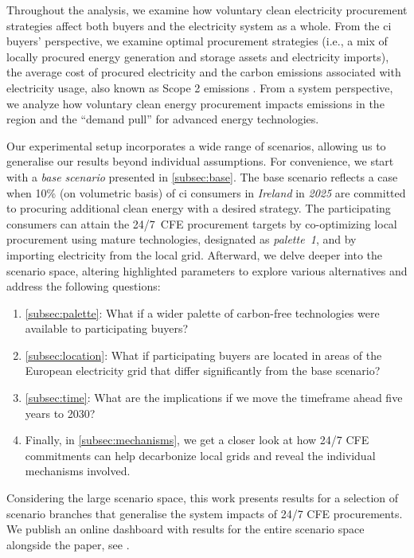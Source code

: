 
Throughout the analysis, we examine how voluntary clean electricity procurement strategies affect both buyers and the electricity system as a whole.
From the \gls{ci} buyers' perspective, we examine optimal procurement strategies (i.e., a mix of locally procured energy generation and storage assets and electricity imports), the average cost of procured electricity and the carbon emissions associated with electricity usage, also known as Scope 2 emissions \cite{GHGProtocolScope2}.
From a system perspective, we analyze how voluntary clean energy procurement impacts \co emissions in the region and the \enquote{demand pull} for advanced energy technologies.

Our experimental setup incorporates a wide range of scenarios, allowing us to generalise our results beyond individual assumptions.
For convenience, we start with a \textit{base scenario} presented in \cref{subsec:base}.
The base scenario reflects a case when 10\% (on volumetric basis) of \gls{ci} consumers in \textit{Ireland} in \textit{2025} are committed to procuring additional clean energy with a desired strategy.
The participating consumers can attain the 24/7~CFE procurement targets by co-optimizing local procurement using mature technologies, designated as \textit{palette~1}, and by importing electricity from the local grid. Afterward, we delve deeper into the scenario space, altering highlighted parameters to explore various alternatives and address the following questions:

\begin{enumerate}[-]
\item \cref{subsec:palette}: What if a wider palette of carbon-free technologies were available to participating buyers?
\item \cref{subsec:location}: What if participating buyers are located in areas of the European electricity grid that differ significantly from the base scenario?
\item \cref{subsec:time}: What are the implications if we move the timeframe ahead five years to 2030?
\item Finally, in \cref{subsec:mechanisms}, we get a closer look at how 24/7 CFE commitments can help decarbonize local grids and reveal the individual mechanisms involved.
\end{enumerate}

Considering the large scenario space, this work presents results for a selection of scenario branches that generalise the system impacts of 24/7 CFE procurements.
We publish an online dashboard with results for the entire scenario space alongside the paper, see .

